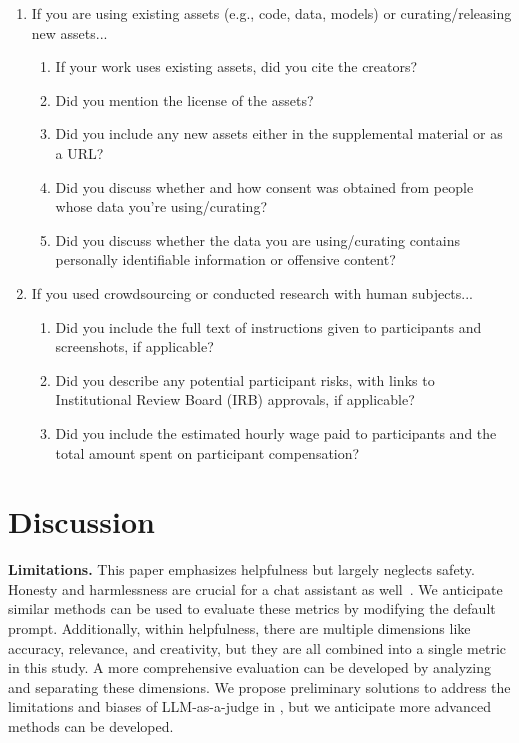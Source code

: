 \begin{enumerate}
\item If you are using existing assets (e.g., code, data, models) or curating/releasing new assets...
\begin{enumerate}
  \item If your work uses existing assets, did you cite the creators?
    \answerYes{}{}
  \item Did you mention the license of the assets?
    \answerYes{}
  \item Did you include any new assets either in the supplemental material or as a URL?
    \answerYes{}
  \item Did you discuss whether and how consent was obtained from people whose data you're using/curating?
  \item Did you discuss whether the data you are using/curating contains personally identifiable information or offensive content?
\end{enumerate}

\item If you used crowdsourcing or conducted research with human subjects...
\begin{enumerate}
  \item Did you include the full text of instructions given to participants and screenshots, if applicable?
  \item Did you describe any potential participant risks, with links to Institutional Review Board (IRB) approvals, if applicable?
    \answerNA{}
  \item Did you include the estimated hourly wage paid to participants and the total amount spent on participant compensation?
\end{enumerate}

\end{enumerate}


\section{Discussion}
\label{sec:discussion}

\textbf{Limitations.}
This paper emphasizes helpfulness but largely neglects safety. Honesty and harmlessness are crucial for a chat assistant as well~\cite{bai2022training}. We anticipate similar methods can be used to evaluate these metrics by modifying the default prompt. Additionally, within helpfulness, there are multiple dimensions like accuracy, relevance, and creativity, but they are all combined into a single metric in this study. A more comprehensive evaluation can be developed by analyzing and separating these dimensions. 
We propose preliminary solutions to address the limitations and biases of LLM-as-a-judge in , but we anticipate more advanced methods can be developed.



